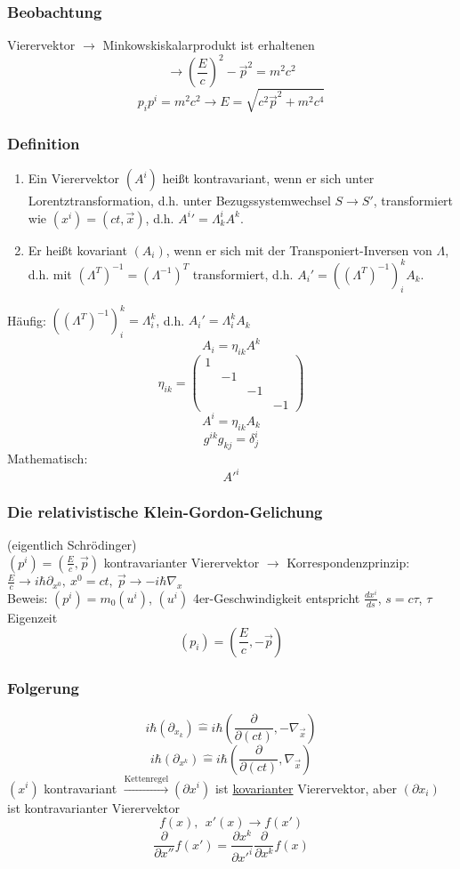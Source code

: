 \documentclass[twoside,a4paper]{scrartcl}
\renewcommand{\1}{\mathds{1}}
\newcommand{\ra}{\rightarrow}
\newcommand{\entspricht}{\mathrel{\widehat{=}}}
\renewcommand{\L}{\Lambda}
\begin{document}
\subsubsection*{Beobachtung}
Vierervektor $\ra$ Minkowskiskalarprodukt ist erhaltenen
$$\ra (\frac{E}{c})^2-\vec p^2=m^2c^2$$
$$p_ip^i=m^2c^2 \ra E=\sqrt{c^2\vec p^2+m^2c^4}$$

\subsubsection*{Definition}
\begin{enumerate}
\item Ein Vierervektor $(A^i)$ heißt kontravariant, wenn er sich unter Lorentztransformation, d.h. unter Bezugssystemwechsel $S \ra S'$, transformiert wie $(x^i)=(ct,\vec x)$, d.h. ${A^i}'=\L_k^iA^k$.
\item Er heißt kovariant $(A_i)$, wenn er sich mit der Transponiert-Inversen von $\L$, d.h. mit $(\L^T)^{-1}=(\L^{-1})^T$ transformiert, d.h. $A_i'=((\L^T)^{-1})^k_i A_k$.
\end{enumerate}
Häufig: $((\L^{T})^{-1})^k_i=\L_i^k$, d.h. $A_i'= \L_i^k A_k$
$$A_i=\eta_{ik}A^k$$
$$\eta_{ik}=\begin{pmatrix}1 \\ & -1 \\ & & -1 \\ & & & -1\end{pmatrix}$$
$$A^i=\eta_{ik}A_k$$
$$g^{ik}g_{kj}=\delta_j^i$$
Mathematisch:
$$A'^i$$

\subsubsection{Die relativistische Klein-Gordon-Gelichung}
(eigentlich Schrödinger)\\
$(p^i)=(\frac{E}{c}, \vec p)$ kontravarianter Vierervektor $\ra$ Korrespondenzprinzip:\\ $\frac{E}{c} \ra i\hbar \partial_{x^0}, \ x^0=ct, \ \vec p \ra -i \hbar\nabla_x$\\
Beweis: $(p^i)=m_0(u^i)$, $(u^i)$ 4er-Geschwindigkeit entspricht $\frac{dx^i}{ds}$, $s=c\tau$, $\tau$ Eigenzeit\\
$$(p_i)=(\frac{E}{c},-\vec p)$$

\subsubsection*{Folgerung}
$$i \hbar (\partial_{x_k})\entspricht i \hbar(\frac{\partial}{\partial (ct)},-\nabla_{\vec x})$$
$$i \hbar (\partial_{x^k})\entspricht i \hbar(\frac{\partial}{\partial (ct)},\nabla_{\vec x})$$
$(x^i)$ kontravariant $\stackrel{\mathrm{Kettenregel}}{\ra} (\partial x^i)$ ist \underline{kovarianter} Vierervektor, aber $(\partial x_i)$ ist kontravarianter Vierervektor\\
$$f(x), \ \ x'(x) \ra f(x')$$
$$\frac{\partial}{\partial x''}f(x')=\frac{\partial x^k}{\partial x'^i}\frac{\partial}{\partial x^k}f(x)$$
\end{document}
